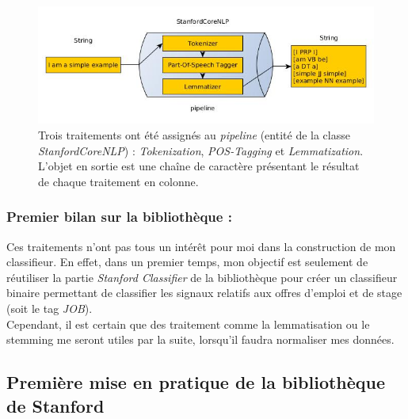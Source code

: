             \begin{figure}[h!]
                \centering
                \includegraphics[width=\textwidth]{images/coreNLP.jpg}
                \caption{Trois traitements ont été assignés au \textit{pipeline} (entité de la classe \textit{StanfordCoreNLP}) : \textit{Tokenization}, \textit{POS-Tagging} et \textit{Lemmatization}. L'objet en sortie est une chaîne de caractère présentant le résultat de chaque traitement en colonne.}
                \label{fig:coreNLP}
            \end{figure}

            \subsubsection{Premier bilan sur la bibliothèque :}
                Ces traitements n'ont pas tous un intérêt pour moi dans la construction de mon classifieur. En effet, dans un premier temps, mon objectif est seulement de réutiliser la partie \textit{Stanford Classifier} de la bibliothèque pour créer un classifieur binaire permettant de classifier les signaux relatifs aux offres d'emploi et de stage (soit le tag \textit{JOB}).\\

                Cependant, il est certain que des traitement comme la lemmatisation ou le stemming me seront utiles par la suite, lorsqu'il faudra normaliser mes données.

        \subsection{Première mise en pratique de la bibliothèque de Stanford}
